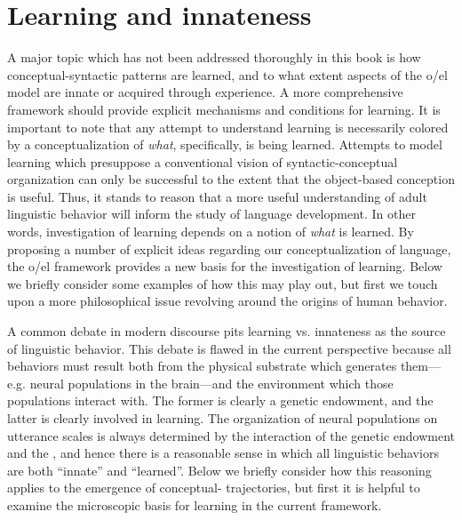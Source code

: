 \section{Learning and innateness}

A major topic which has not been addressed thoroughly in this book is how conceptual-syntactic patterns are learned, and to what extent aspects of the o/el model are innate or acquired through experience. A more comprehensive framework should provide explicit mechanisms and conditions for learning. It is important to note that any attempt to understand learning is necessarily colored by a conceptualization of \textit{what}, specifically, is being learned. Attempts to model learning which presuppose a conventional vision of syntactic-conceptual organization can only be successful to the extent that the object-based conception is useful. Thus, it stands to reason that a more useful understanding of adult linguistic behavior will inform the study of language development. In other words, investigation of learning depends on a notion of \textit{what} is learned. By proposing a number of explicit ideas regarding our conceptualization of language, the o/el framework provides a new basis for the investigation of learning. Below we briefly consider some examples of how this may play out, but first we touch upon a more philosophical issue revolving around the origins of human behavior.

A common debate in modern discourse pits learning vs. innateness as the source of linguistic behavior. This debate is flawed in the current perspective because all behaviors must result both from the physical substrate which generates them—e.g. neural populations in the brain—and the environment which those populations interact with. The former is clearly a genetic endowment, and the latter is clearly involved in learning. The organization of neural populations on utterance scales is always determined by the interaction of the genetic endowment and the , and hence there is a reasonable sense in which all linguistic behaviors are both “innate” and “learned”.  Below we briefly consider how this reasoning applies to the emergence of conceptual- trajectories, but first it is helpful to examine the microscopic basis for learning in the current framework.

